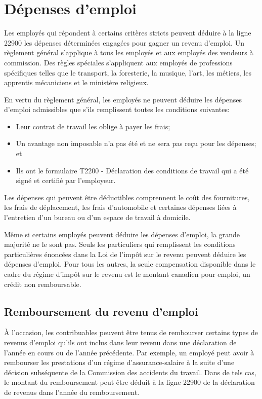 \section{Dépenses d'emploi}
\begin{intro}
	Les employés qui répondent à certains critères stricts peuvent déduire à la ligne 22900 les dépenses déterminées engagées pour gagner un revenu d'emploi. Un règlement général s'applique à tous les employés et aux employés des vendeurs à commission. Des règles spéciales s'appliquent aux employés de professions spécifiques telles que le transport, la foresterie, la musique, l'art, les métiers, les apprentis mécaniciens et le ministère religieux.
\end{intro}

En vertu du règlement général, les employés ne peuvent déduire les dépenses d'emploi admissibles que s'ils remplissent toutes les conditions suivantes:
\begin{itemize}
	\item Leur contrat de travail les oblige à payer les frais;
	\item Un avantage non imposable n'a pas été et ne sera pas reçu pour les dépenses; et
	\item Ils ont le formulaire T2200 - Déclaration des conditions de travail qui a été signé et certifié par l'employeur.
\end{itemize}

Les dépenses qui peuvent être déductibles comprennent le coût des fournitures, les frais de déplacement, les frais d'automobile et certaines dépenses liées à l'entretien d'un bureau ou d'un espace de travail à domicile.

Même si certains employés peuvent déduire les dépenses d'emploi, la grande majorité ne le sont pas. Seuls les particuliers qui remplissent les conditions particulières énoncées dans la Loi de l'impôt sur le revenu peuvent déduire les dépenses d'emploi. Pour tous les autres, la seule compensation disponible dans le cadre du régime d'impôt sur le revenu est le montant canadien pour emploi, un crédit non remboursable.


\subsection{Remboursement du revenu d'emploi}
À l'occasion, les contribuables peuvent être tenus de rembourser certains types de revenus d'emploi qu'ils ont inclus dans leur revenu dans une déclaration de l'année en cours ou de l'année précédente. Par exemple, un employé peut avoir à rembourser les prestations d'un régime d'assurance-salaire à la suite d'une décision subséquente de la Commission des accidents du travail. Dans de tels cas, le montant du remboursement peut être déduit à la ligne 22900 de la déclaration de revenus dans l'année du remboursement.

